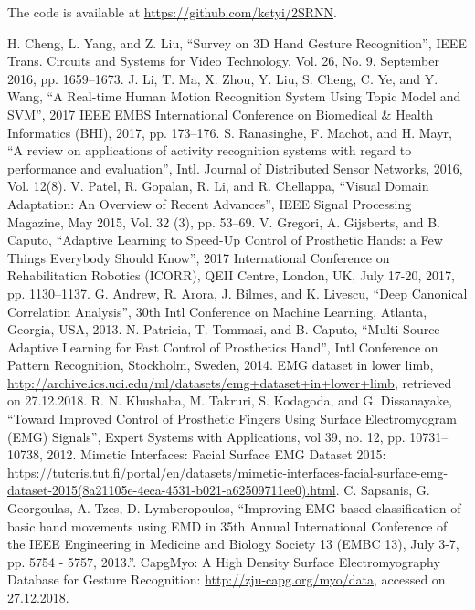 \documentclass[conference]{IEEEtran}
\begin{document}
{\begin{minipage}{\textwidth}
The code is available at \url{https://github.com/ketyi/2SRNN}.

\begin{thebibliography}{00}
 H. Cheng, L. Yang, and Z. Liu, ``Survey on 3D Hand Gesture Recognition'', IEEE Trans. Circuits and Systems for Video Technology, Vol. 26, No. 9, September 2016, pp. 1659--1673.
 J. Li, T. Ma, X. Zhou, Y. Liu, S. Cheng, C. Ye, and Y. Wang, ``A Real-time Human Motion Recognition System Using Topic Model and SVM'', 2017 IEEE EMBS International Conference on Biomedical \& Health Informatics (BHI), 2017, pp. 173--176.
 S. Ranasinghe, F. Machot, and H. Mayr, ``A review on applications of activity recognition systems with regard to performance and evaluation'', Intl. Journal of Distributed Sensor Networks, 2016, Vol. 12(8).
 V. Patel, R. Gopalan, R. Li, and R. Chellappa, ``Visual Domain Adaptation: An Overview of Recent Advances'', IEEE Signal Processing Magazine, May 2015, Vol. 32 (3), pp. 53--69.
 V. Gregori, A. Gijsberts, and B. Caputo, ``Adaptive Learning to Speed-Up Control of Prosthetic Hands: a Few Things Everybody Should Know'', 2017 International Conference on Rehabilitation Robotics (ICORR), QEII Centre, London, UK, July 17-20, 2017, pp. 1130--1137.
 G. Andrew, R. Arora, J. Bilmes, and K. Livescu, ``Deep Canonical Correlation Analysis'', 30th Intl Conference on Machine Learning, Atlanta, Georgia, USA, 2013.
 N. Patricia, T. Tommasi, and B. Caputo, ``Multi-Source Adaptive Learning for Fast Control of Prosthetics Hand'',  Intl Conference on Pattern Recognition, Stockholm, Sweden, 2014.
 EMG dataset in lower limb, \url{http://archive.ics.uci.edu/ml/datasets/emg+dataset+in+lower+limb}, retrieved on 27.12.2018.
 R. N. Khushaba, M. Takruri, S. Kodagoda, and G. Dissanayake, ``Toward Improved Control of Prosthetic Fingers Using Surface Electromyogram (EMG) Signals'', Expert Systems with Applications, vol 39, no. 12, pp. 10731–10738, 2012.
 Mimetic Interfaces: Facial Surface EMG Dataset 2015: \url{https://tutcris.tut.fi/portal/en/datasets/mimetic-interfaces-facial-surface-emg-dataset-2015(8a21105e-4eca-4531-b021-a62509711ee0).html}.
 C. Sapsanis, G. Georgoulas, A. Tzes, D. Lymberopoulos, ``Improving EMG based classification of basic hand movements using EMD in 35th Annual International Conference of the IEEE Engineering in Medicine and Biology Society 13 (EMBC 13), July 3-7, pp. 5754 - 5757, 2013.''.
 CapgMyo: A High Density Surface Electromyography Database for Gesture Recognition: \url{http://zju-capg.org/myo/data}, accessed on 27.12.2018.

\end{thebibliography}
\end{minipage}}
\end{document}
